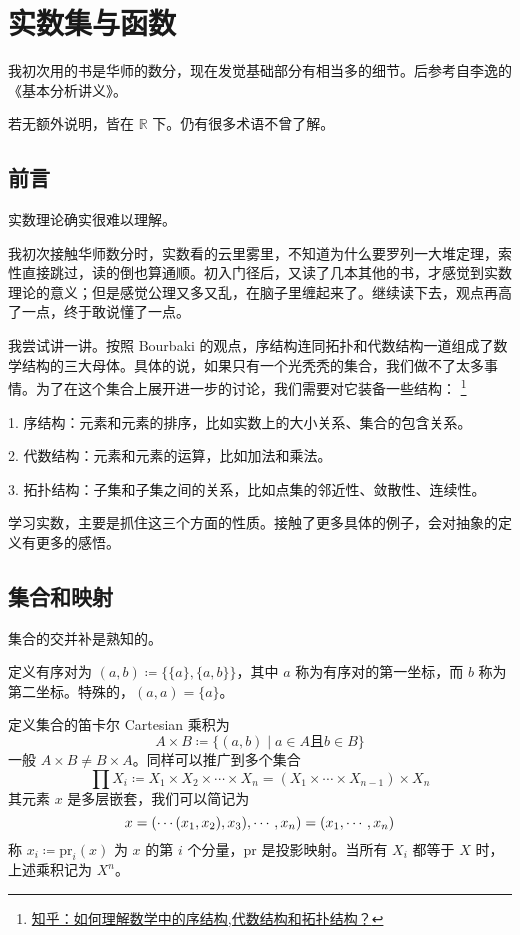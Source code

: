 \chapter{实数集与函数}

我初次用的书是华师的数分，现在发觉基础部分有相当多的细节。后参考自李逸的《基本分析讲义》。

若无额外说明，皆在 $\mathbb{R}$ 下。仍有很多术语不曾了解。

\section{前言}

实数理论确实很难以理解。

我初次接触华师数分时，实数看的云里雾里，不知道为什么要罗列一大堆定理，索性直接跳过，读的倒也算通顺。初入门径后，又读了几本其他的书，才感觉到实数理论的意义；但是感觉公理又多又乱，在脑子里缠起来了。继续读下去，观点再高了一点，终于敢说懂了一点。

我尝试讲一讲。按照 Bourbaki 的观点，序结构连同拓扑和代数结构一道组成了数学结构的三大母体。具体的说，如果只有一个光秃秃的集合，我们做不了太多事情。为了在这个集合上展开进一步的讨论，我们需要对它装备一些结构：
\footnote{\href{https://www.zhihu.com/question/47999353/answer/1012530744}{知乎：如何理解数学中的序结构,代数结构和拓扑结构？}}

1. 序结构：元素和元素的排序，比如实数上的大小关系、集合的包含关系。

2. 代数结构：元素和元素的运算，比如加法和乘法。

3. 拓扑结构：子集和子集之间的关系，比如点集的邻近性、敛散性、连续性。

学习实数，主要是抓住这三个方面的性质。接触了更多具体的例子，会对抽象的定义有更多的感悟。

\section{集合和映射}

集合的交并补是熟知的。

定义有序对为 $(a,b) \coloneqq  \{\{a\},\{a,b\}\}$，其中 $a$ 称为有序对的第一坐标，而 $b$ 称为第二坐标。特殊的，$(a,a) = \{a\}$。

定义集合的笛卡尔 Cartesian 乘积为
\[ A \times B \coloneqq  \{(a,b) \mid a\in A \text{且} b\in B\}\]
一般 $A \times B \ne B \times A$。同样可以推广到多个集合
\[ \prod X_i \coloneqq  X_1 \times X_2 \times \cdots \times X_n = (X_1 \times \cdots \times X_{n-1}) \times X_n\]
其元素 $x$ 是多层嵌套，我们可以简记为
\[ x = (\cdots(x_1,x_2),x_3),\cdots,x_n) = (x_1,\cdots,x_n)\]
称 $x_i \coloneqq  \mathrm{pr}_i(x)$ 为 $x$ 的第 $i$ 个分量，$\mathrm{pr}$ 是投影映射。当所有 $X_i$ 都等于 $X$ 时，上述乘积记为 $X^n$。

